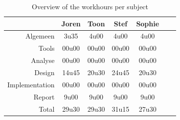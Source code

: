\documentclass[i2]{oss}
\begin{document}
\begin{table}[h!]
\begin{center}
    \begin{tabular}{ r | c  c  c  c  c  c}
     & Joren & Toon & Stef & Sophie \\ \hline
    Algemeen & 3u35 & 4u00 & 4u00 & 4u00\\
           Tools & 00u00 & 00u00 & 00u00 & 00u00 \\
        Analyse & 00u00 & 00u00 & 00u00 & 00u00 \\
        Design & 14u45 & 20u30 & 24u45 & 20u30 \\
        Implementation & 00u00 & 00u00 & 00u00 & 00u00\\
        Report & 9u00 & 9u00 & 9u00 & 9u00 \\
        Total & 29u30 & 29u30 & 31u15 & 27u30  
    \end{tabular}
    \caption{Overview of the workhours per subject}
    \label{tab:werkuren}
\end{center}
\end{table}
\end{document}
